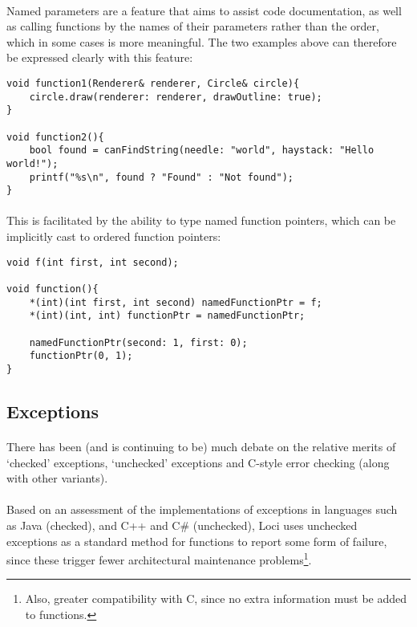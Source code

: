 \documentclass[12pt,twoside,notitlepage]{report}
\begin{document}
\paragraph{}
Named parameters are a feature that aims to assist code documentation, as well as calling functions by the names of their parameters rather than the order, which in some cases is more meaningful. The two examples above can therefore be expressed clearly with this feature:

\small{
\begin{verbatim}
void function1(Renderer& renderer, Circle& circle){
    circle.draw(renderer: renderer, drawOutline: true);
}

void function2(){
    bool found = canFindString(needle: "world", haystack: "Hello world!");
    printf("%s\n", found ? "Found" : "Not found");
}
\end{verbatim}
}

\paragraph{}
This is facilitated by the ability to type named function pointers, which can be implicitly cast to ordered function pointers:

\small{
\begin{verbatim}
void f(int first, int second);

void function(){
    *(int)(int first, int second) namedFunctionPtr = f;
    *(int)(int, int) functionPtr = namedFunctionPtr;
    
    namedFunctionPtr(second: 1, first: 0);
    functionPtr(0, 1);
}
\end{verbatim}
}

\subsection{Exceptions}

\paragraph{}
There has been (and is continuing to be) much debate on the relative merits of `checked' exceptions, `unchecked' exceptions and C-style error checking (along with other variants).

\paragraph{}
Based on an assessment of the implementations of exceptions in languages such as Java (checked), and C++ and C\# (unchecked), Loci uses unchecked exceptions as a standard method for functions to report some form of failure, since these trigger fewer architectural maintenance problems\footnote{Also, greater compatibility with C, since no extra information must be added to functions.}.
\end{document}
